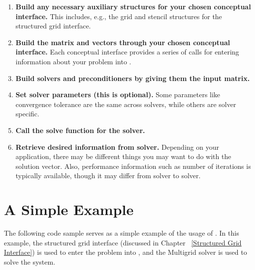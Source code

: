 \begin{enumerate}

\item
{\bf Build any necessary auxiliary structures for your chosen
conceptual interface.} This includes, e.g., the grid and stencil
structures for the structured grid interface.

\item
{\bf Build the matrix and vectors through your chosen conceptual
interface.} Each conceptual interface provides a series of calls for
entering information about your problem into
\hypre{}.

\item
{\bf Build solvers and preconditioners by giving them the input
matrix.}

\item
{\bf Set solver parameters (this is optional).}  Some parameters like
convergence tolerance are the same across solvers, while others are
solver specific.

\item
{\bf Call the solve function for the solver.}

\item
{\bf Retrieve desired information from solver.} Depending on your
application, there may be different things you may want to do with the
solution vector. Also, performance information such as number of
iterations is typically available, though it may differ from solver to
solver.

\end{enumerate}


\section{A Simple Example}

The following code sample serves as a simple example of the usage of
\hypre{}. In this example, the structured grid interface (discussed in
Chapter ~\ref{Structured Grid Interface}) is used to enter the problem
into \hypre{}, and the  Multigrid solver is used to solve
the system.

